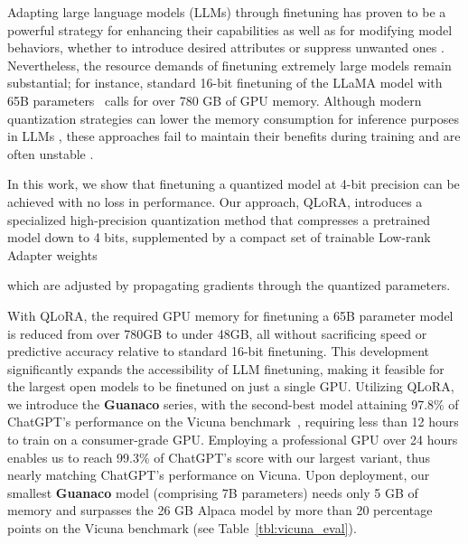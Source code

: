 Adapting large language models (LLMs) through finetuning has proven to be a powerful strategy for enhancing their capabilities \citep{min2021metaicl, wei2021finetuned, ouyang2022training, wang2022super, wang2022self, liu2022few} as well as for modifying model behaviors, whether to introduce desired attributes or suppress unwanted ones \citep{ouyang2022training,askell2021general,bai2022training}. Nevertheless, the resource demands of finetuning extremely large models remain substantial; for instance, standard 16-bit finetuning of the LLaMA model with 65B parameters~\citep{touvron2023llama} calls for over 780 GB of GPU memory. Although modern quantization strategies can lower the memory consumption for inference purposes in LLMs \citep{dettmers2022llm, dettmers2022case, frantar2022gptq, xiao2022smoothquant}, these approaches fail to maintain their benefits during training and are often unstable \citep{wortsman2023stable}.

In this work, we show that finetuning a quantized model at 4-bit precision can be achieved with no loss in performance. Our approach, \textsc{QLoRA}, introduces a specialized high-precision quantization method that compresses a pretrained model down to 4 bits, supplemented by a compact set of trainable Low-rank Adapter weights \citep{hu2021lora} 

which are adjusted by propagating gradients through the quantized parameters. 

With \textsc{QLoRA}, the required GPU memory for finetuning a 65B parameter model is reduced from over 780GB to under 48GB, all without sacrificing speed or predictive accuracy relative to standard 16-bit finetuning. This development significantly expands the accessibility of LLM finetuning, making it feasible for the largest open models to be finetuned on just a single GPU. Utilizing \textsc{QLoRA}, we introduce the \textbf{Guanaco} series, with the second-best model attaining 97.8\% of ChatGPT's performance on the Vicuna benchmark~\citep{vicuna2023}, requiring less than 12 hours to train on a consumer-grade GPU. Employing a professional GPU over 24 hours enables us to reach 99.3\% of ChatGPT's score with our largest variant, thus nearly matching ChatGPT's performance on Vicuna. Upon deployment, our smallest \textbf{Guanaco} model (comprising 7B parameters) needs only 5 GB of memory and surpasses the 26 GB Alpaca model by more than 20 percentage points on the Vicuna benchmark (see Table~\ref{tbl:vicuna_eval}).

